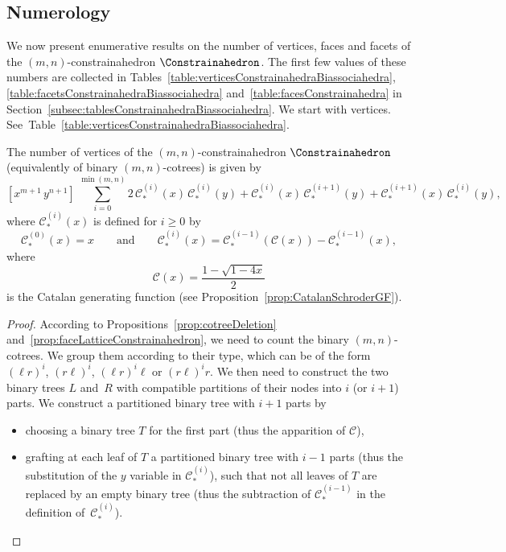 \documentclass[AHL,Unicode,longabstracts,published]{cedram}
\newcommand{\CGF}{\mathcal{C}}
\newcommand{\tCGF}{\mathcal{C}_\ast}
\begin{document}
\subsection{Numerology}\label{subsec:numerologyConstrainahedra}

We now present enumerative results on the number of vertices, faces and facets of the $(m,n)$-constrainahedron $\Constrainahedron$. The first few values of these numbers are collected in Tables~\ref{table:verticesConstrainahedraBiassociahedra}, \ref{table:facetsConstrainahedraBiassociahedra} and~\ref{table:facesConstrainahedra} in Section~\ref{subsec:tablesConstrainahedraBiassociahedra}. We start with vertices. See~Table~\ref{table:verticesConstrainahedraBiassociahedra}.

\begin{prop}\label{prop:numberVerticesConstrainahedra}
The number of vertices of the $(m,n)$-constrainahedron \linebreak $\Constrainahedron$ (equivalently of binary $(m,n)$-cotrees) is given by
\[
\left[x^{m+1} \, y^{n+1}\right] \, \sum_{i = 0}^{\min(m,n)} 2 \, \tCGF^{(i)}(x) \, \tCGF^{(i)}(y) + \tCGF^{(i)}(x) \, \tCGF^{(i+1)}(y) + \tCGF^{(i+1)}(x) \, \tCGF^{(i)}(y),
\]
where $\tCGF^{(i)}(x)$ is defined for $i \ge 0$ by
\[
\tCGF^{(0)}(x) = x
\qquad\text{and}\qquad
\tCGF^{(i)}(x) = \tCGF^{(i-1)}(\CGF(x)) - \tCGF^{(i-1)}(x),
\]
where
\[
\CGF(x) = \frac{1-\sqrt{1-4x}}{2}
\]
is the Catalan generating function (see Proposition~\ref{prop:CatalanSchroderGF}).
\end{prop}

\begin{proof}
According to Propositions~\ref{prop:cotreeDeletion} and~\ref{prop:faceLatticeConstrainahedron}, we need to count the binary $(m,n)$-cotrees. We group them according to their type, which can be of the form $(\ell r)^i$, $(r\ell)^i$, $(\ell r)^i\ell$ or $(r\ell)^ir$. We then need to construct the two binary trees $L$ and~$R$ with compatible partitions of their nodes into $i$ (or $i+1$) parts. We construct a partitioned binary tree with $i+1$ parts by
\begin{itemize}
\item choosing a binary tree $T$ for the first part (thus the apparition of $\CGF$),
\item grafting at each leaf of $T$ a partitioned binary tree with $i-1$ parts (thus the substitution of the $y$ variable in $\tCGF^{(i)}$), such that not all leaves of $T$ are replaced by an empty binary tree (thus the subtraction of $\tCGF^{(i-1)}$ in the definition of~$\tCGF^{(i)}$).\qedhere
\end{itemize}
\end{proof}
\end{document}
